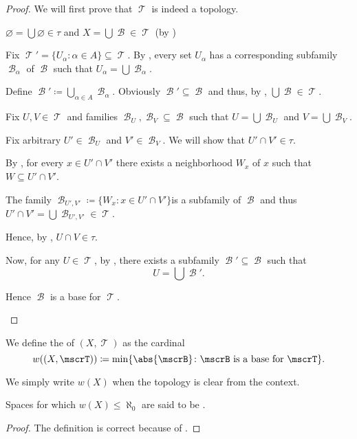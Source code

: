 \begin{proof}
  We will first prove that \( \mscrT \) is indeed a topology.

  \begin{reflist}
     \( \varnothing = \bigcup \varnothing \in \tau \) and \( X = \bigcup \mscrB \in \mscrT \) (by )

     Fix \( \mscrT' = \{ U_\alpha \colon \alpha \in A \} \subseteq \mscrT \). By , every set \( U_\alpha \) has a corresponding subfamily \( \mscrB_\alpha \) of \( \mscrB \) such that \( U_\alpha = \bigcup \mscrB_\alpha \).

    Define \( \mscrB' \coloneqq \bigcup_{\alpha \in A} \mscrB_\alpha \). Obviously \( \mscrB' \subseteq \mscrB \) and thus, by , \( \bigcup \mscrB \in \mscrT \).

     Fix \( U, V \in \mscrT \) and families \( \mscrB_U, \mscrB_V \subseteq \mscrB \) such that \( U = \bigcup \mscrB_U \) and \( V = \bigcup \mscrB_V \).

    Fix arbitrary \( U' \in \mscrB_U \) and \( V' \in \mscrB_V \). We will show that \( U' \cap V' \in \tau \).

    By , for every \( x \in U' \cap V' \) there exists a neighborhood \( W_x \) of \( x \) such that \( W \subseteq U' \cap V' \).

    The family \( \mscrB_{U',V'} \coloneqq \{ W_x \colon x \in U' \cap V' \} \)\AOC is a subfamily of \( \mscrB \) and thus \( U' \cap V' = \bigcup \mscrB_{U',V'} \in \mscrT \).

    Hence, by , \( U \cap V \in \tau \).

    Now, for any \( U \in \mscrT \), by , there exists a subfamily \( \mscrB' \subseteq \mscrB \) such that
    \begin{equation*}
      U = \bigcup \mscrB'.
    \end{equation*}

    Hence \( \mscrB \) is a base for \( \mscrT \).
  \end{reflist}
\end{proof}

\begin{definition}\label{def:topological_space_weight}
  We define the  of \( (X, \mscrT) \) as the cardinal
  \begin{equation*}
    w((X, \mscrT)) \coloneqq \min \{ \abs{\mscrB} \colon \mscrB \text{ is a base for } \mscrT \}.
  \end{equation*}

  We simply write \( w(X) \) when the topology is clear from the context.

  Spaces for which \( w(X) \leq \aleph_0 \) are said to be .
\end{definition}
\begin{proof}
  The definition is correct because of .
\end{proof}


